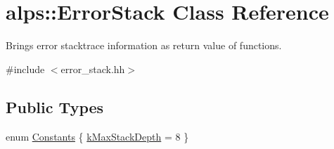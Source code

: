 \hypertarget{classalps_1_1ErrorStack}{}\section{alps\+:\+:Error\+Stack Class Reference}
\label{classalps_1_1ErrorStack}


Brings error stacktrace information as return value of functions.  




{\ttfamily \#include $<$error\+\_\+stack.\+hh$>$}

\subsection*{Public Types}
\begin{DoxyCompactItemize}
\item 
enum \hyperlink{classalps_1_1ErrorStack_a18b861743a2de89ca205ffa2d91e6997}{Constants} \{ \hyperlink{classalps_1_1ErrorStack_a18b861743a2de89ca205ffa2d91e6997abd01de12344bb39aa89faef49805ac46}{k\+Max\+Stack\+Depth} = 8
 \}
\end{DoxyCompactItemize}
